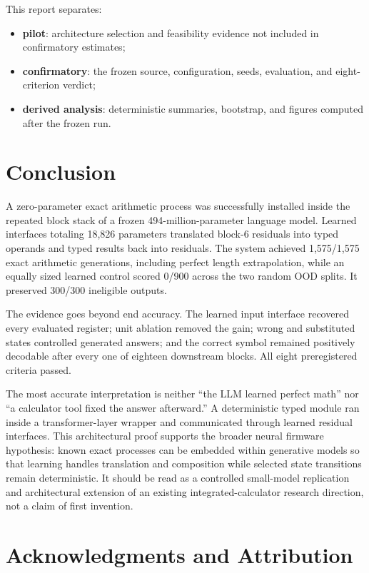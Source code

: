 \documentclass[11pt]{article}
\begin{document}
This report separates:

\begin{itemize}
  \item \textbf{pilot}: architecture selection and feasibility evidence not
  included in confirmatory estimates;
  \item \textbf{confirmatory}: the frozen source, configuration, seeds,
  evaluation, and eight-criterion verdict;
  \item \textbf{derived analysis}: deterministic summaries, bootstrap, and
  figures computed after the frozen run.
\end{itemize}

\section{Conclusion}

A zero-parameter exact arithmetic process was successfully installed inside
the repeated block stack of a frozen 494-million-parameter language model.
Learned interfaces totaling 18,826 parameters translated block-6 residuals
into typed operands and typed results back into residuals. The system achieved
1,575/1,575 exact arithmetic generations, including perfect length
extrapolation, while an equally sized learned control scored 0/900 across the
two random OOD splits. It preserved 300/300 ineligible outputs.

The evidence goes beyond end accuracy. The learned input interface recovered
every evaluated register; unit ablation removed the gain; wrong and substituted
states controlled generated answers; and the correct symbol remained
positively decodable after every one of eighteen downstream blocks. All eight
preregistered criteria passed.

The most accurate interpretation is neither ``the LLM learned perfect math''
nor ``a calculator tool fixed the answer afterward.'' A deterministic typed
module ran inside a transformer-layer wrapper and communicated through learned
residual interfaces. This architectural proof supports the broader neural
firmware hypothesis: known exact processes can be embedded within generative
models so that learning handles translation and composition while selected
state transitions remain deterministic. It should be read as a controlled
small-model replication and architectural extension of an existing
integrated-calculator research direction, not a claim of first invention.

\section*{Acknowledgments and Attribution}
\end{document}
